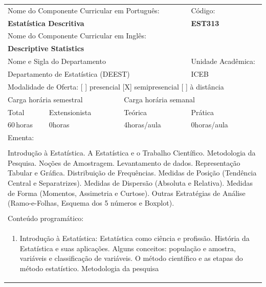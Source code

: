 \documentclass[11pt]{article}
\begin{document}
\begin{center}
\begin{longtable}{|p{4cm}|p{4cm}|p{4cm}|p{4cm}|}
\hline
\multicolumn{3}{|p{12cm}|}{Nome do Componente Curricular em Português:} &
\multicolumn{1}{p{4cm}|}{Código:} \\ 
\multicolumn{3}{|p{12cm}|}{\textbf{Estatística Descritiva}} &
\textbf{EST313}\\ 
\multicolumn{3}{|p{12cm}|}{Nome do Componente Curricular em Inglês:} & \\ 
\multicolumn{3}{|p{12cm}|}{\textbf{Descriptive Statistics}} & \\ 
\hline
\multicolumn{3}{|p{12cm}|}{Nome e Sigla do Departamento} & Unidade Acadêmica: \\ 
\multicolumn{3}{|p{12cm}|}{Departamento de Estatística (DEEST)} & {ICEB} \\ 
\hline
\multicolumn{4}{|p{16cm}|}{Modalidade de Oferta:
[ ] presencial \hspace{0.6cm}
[X] semipresencial \hspace{0.6cm}
[ ] à distância}\\
\hline
\multicolumn{2}{|p{8cm}|}{Carga horária semestral} &
\multicolumn{2}{p{8cm}|}{Carga horária semanal}\\
\hline
\multicolumn{1}{|p{4cm}|}{Total} &
\multicolumn{1}{p{4cm}|}{Extensionista} &
\multicolumn{1}{p{4cm}|}{Teórica} &
\multicolumn{1}{p{4cm}|}{Prática} \\ 
\multicolumn{1}{|p{4cm}|}{60\,horas} &
\multicolumn{1}{p{4cm}|}{0\;horas} &
\multicolumn{1}{p{4cm}|}{4\;horas/aula} &
\multicolumn{1}{p{4cm}|}{0\;horas/aula} \\ 
\hline
\multicolumn{4}{|p{16cm}|}{Ementa:}\\
\multicolumn{4}{|p{16cm}|}{}\\
\multicolumn{4}{|p{\dimexpr 16cm + 6\tabcolsep\relax}|}{Introdução à Estatística. A Estatística e o Trabalho Científico. Metodologia da Pesquisa. Noções de Amostragem. Levantamento de dados. Representação Tabular e Gráfica. Distribuição de Frequências. Medidas de Posição (Tendência Central e Separatrizes). Medidas de Dispersão (Absoluta e Relativa). Medidas de Forma (Momentos, Assimetria e Curtose). Outras Estratégias de Análise (Ramo-e-Folhas, Esquema dos 5 números e Boxplot).}\\
\multicolumn{4}{|p{16cm}|}{}\\
\hline
\multicolumn{4}{|p{16cm}|}{Conteúdo programático:}\\*
\multicolumn{4}{|p{\dimexpr 16cm + 6\tabcolsep\relax}|}{\begin{enumerate}[start=1]\item Introdução à Estatística: Estatística como ciência e profissão. História da Estatística e suas aplicações. Alguns conceitos: população e amostra, variáveis e classificação de variáveis. O método científico e as etapas do método estatístico. Metodologia da pesquisa\end{enumerate}}\\

\end{longtable}
\end{center}
\end{document}
